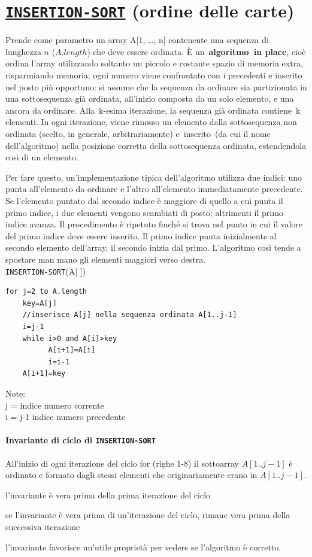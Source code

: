 \documentclass[11pt,a4paper]{article}
\begin{document}
\section{\href{https://upload.wikimedia.org/wikipedia/commons/0/0f/Insertion-sort-example-300px.gif}{\texttt{INSERTION-SORT}} (ordine delle carte)}
Prende come parametro un array A[1, …, n] contenente una sequenza di lunghezza $n$ ($A.length$) che deve essere ordinata. È un \textbf{algoritmo in place}, cioè ordina l'array utilizzando soltanto un piccolo e costante spazio di memoria extra, risparmiando memoria; ogni numero viene confrontato con i precedenti e inserito nel posto più opportuno: si assume che la sequenza da ordinare sia partizionata in una sottosequenza già ordinata, all'inizio composta da un solo elemento, e una ancora da ordinare. Alla k-esima iterazione, la sequenza già ordinata contiene k elementi. In ogni iterazione, viene rimosso un elemento dalla sottosequenza non ordinata (scelto, in generale, arbitrariamente) e inserito (da cui il nome dell'algoritmo) nella posizione corretta della sottosequenza ordinata, estendendola così di un elemento.

Per fare questo, un'implementazione tipica dell'algoritmo utilizza due indici: uno punta all'elemento da ordinare e l'altro all'elemento immediatamente precedente. Se l'elemento puntato dal secondo indice è maggiore di quello a cui punta il primo indice, i due elementi vengono scambiati di posto; altrimenti il primo indice avanza. Il procedimento è ripetuto finché si trova nel punto in cui il valore del primo indice deve essere inserito. Il primo indice punta inizialmente al secondo elemento dell'array, il secondo inizia dal primo. L'algoritmo così tende a spostare man mano gli elementi maggiori verso destra.
\medskip\\
\texttt{INSERTION-SORT}(A[ ])
\begin{lstlisting}
for j=2 to A.length
    key=A[j]
    //inserisce A[j] nella sequenza ordinata A[1..j-1]
    i=j-1
    while i>0 and A[i]>key
          A[i+1]=A[i]
          i=i-1
    A[i+1]=key
\end{lstlisting}
%
Note:\\
j = indice numero corrente\\
i = j-1 indice numero precedente

\paragraph{Invariante di ciclo di \texttt{INSERTION-SORT}}
All’inizio di ogni iterazione del ciclo for (righe 1-8) il sottoarray $A[1 .. j-1]$ è ordinato e formato dagli stessi elementi che originariamente erano in $A[1 .. j-1]$.
\begin{description}[leftmargin=*]
  \item[Inizializzazione] l’invariante è vera prima della prima iterazione del ciclo
  \item[Conservazione] se l’invariante è vera prima di un’iterazione del ciclo, rimane vera prima della successiva iterazione
  \item[Conclusione] l’invariante favorisce un’utile proprietà per vedere se l’algoritmo è corretto.
\end{description}
\end{document}
